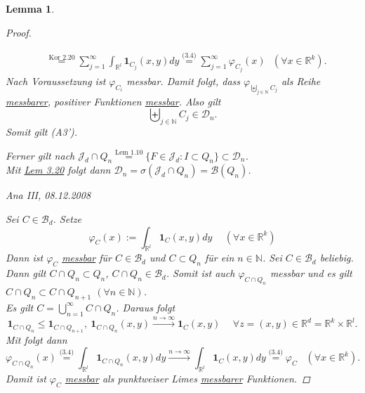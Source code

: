 \documentclass[a4paper]{scrreprt}
\newcommand{\doubleOne}{\textbf{1}}
\newcommand{\R}{\mathbb{R}}
\newcommand{\N}{\mathbb{N}}
\newcommand{\Borel}{\mathcal{B}}
\newcommand{\Bd}{\Borel_d}
\newcommand{\Jd}{\mathcal{J}_d}
\newcommand{\bigdcup}{\biguplus}
\newcommand{\jlabel}[1]{\label{j_#1}}
\newcommand{\jshortlink}[1]{\jhyperref{#1}{\text{#1}}}
\newcommand{\jhyperref}[2]{\hyperref[j_#1]{#2}}
\newcommand{\jlink}[1]{\jhyperref{#1}{#1}}
\newcommand{\BeppoLevi}{\text{\jhyperref{Thm 2.19}{Beppo Levi}}}
\newcommand{\jspacesmall}{\vspace{4pt}}
\newcommand{\jdate}[1]{\jspacesmall\begin{center}\jlabel{#1}\tiny{Ana III, #1}\end{center}}
\theoremstyle{plain}
\newtheorem{lem}[thm]{Lemma}
\theoremstyle{definition}
\begin{document}
{{{{\begin{lem}
\begin{proof}
\begin{itemize}
\begin{displaymath}
\begin{split}
                        &\overset{\jshortlink{Kor 2.20}}{=} \sum_{j=1}^\infty \int_{\R^l} \doubleOne_{C_j}(x,y) dy \overset{\jshortlink{(3.4)}}{=} \sum_{j=1}^\infty \varphi_{C_j}(x) \ \ \ (\forall x\in \R^k).
                    \end{split}
                \end{displaymath}
                Nach Voraussetzung ist $\varphi_{C_i}$ messbar. Damit folgt, dass $\varphi_{\bigdcup_{j\in\N} C_j}$ als Reihe \hyperref[j_messbar]{messbarer}, positiver Funktionen \jlink{messbar}. Also gilt
                \begin{displaymath}
                    \bigdcup_{j\in\N} C_j \in \mathcal{D}_n.
                \end{displaymath}
                Somit gilt (A3').
        \end{itemize}
        Ferner gilt nach $\Jd \cap Q_n \overset{\jshortlink{Lem 1.10}}{=} \{F \in \Jd : I \subset Q_n\} \subset \mathcal{D}_n$.\\
        Mit \jlink{Lem 3.20} folgt dann $\mathcal{D}_n = \sigma(\Jd\cap Q_n) = \Borel(Q_n)$.
        
\jdate{08.12.2008}

        Sei $C\in \Bd$. Setze
        \begin{displaymath}
            \varphi_C(x) := \int_{\R^l} \doubleOne_C(x,y)dy \hspace{15pt} (\forall x\in\R^k)
        \end{displaymath}
        Dann ist $\varphi_C$ \jlink{messbar} für $C\in \Bd$ und $C \subset Q_n$ für ein $n\in\N$. Sei $C\in \Bd$ beliebig. Dann gilt $C\cap Q_n \subset Q_n$, $C\cap Q_n \in \Bd$. Somit ist auch $\varphi_{C\cap Q_n}$ messbar und es gilt $C\cap Q_n\subset C\cap Q_{n+1}$ $(\forall n\in\N)$.\\
        Es gilt $C = \bigcup_{n=1}^\infty C\cap Q_n$. Daraus folgt
        \begin{displaymath}
            \doubleOne_{C\cap Q_n} \le \doubleOne_{C\cap Q_{n+1}}, \ \doubleOne_{C \cap Q_n} (x,y) \xrightarrow{n\rightarrow\infty} \doubleOne_C (x,y) \hspace{15pt} \forall z=(x,y)\in\R^d = \R^k\times \R^l.
        \end{displaymath}
        Mit \BeppoLevi{} folgt dann
        \begin{displaymath}
            \varphi_{C\cap Q_n}(x) \overset{\jshortlink{(3.4)}}{=} \int_{\R^l} \doubleOne_{C\cap Q_n} (x,y)dy \xrightarrow{n\rightarrow\infty} \int_{\R^l} \doubleOne_C (x,y) dy \overset{\jshortlink{(3.4)}}{=} \varphi_C \hspace{10pt} (\forall x\in \R^k).
        \end{displaymath}
        Damit ist $\varphi_C$ \jlink{messbar} als punktweiser Limes \jhyperref{messbar}{messbarer} Funktionen.
    \end{proof}
\end{lem}

}}}}
\end{document}
